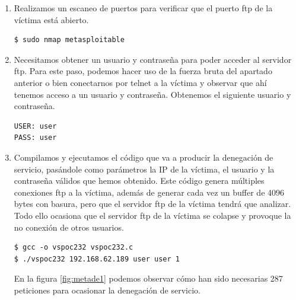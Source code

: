 \documentclass[a4,12pt,onecolum]{article}
\begin{document}
\begin{enumerate}
	\item Realizamos un escaneo de puertos para verificar que el puerto ftp de la víctima está abierto.

\begin{verbatim}
$ sudo nmap metasploitable
\end{verbatim}

	\item Necesitamos obtener un usuario y contraseña para poder acceder al servidor ftp. Para este paso, podemos hacer uso de la fuerza bruta del apartado anterior o bien conectarnos por telnet a la víctima y observar que ahí tenemos acceso a un usuario y contraseña. Obtenemos el siguiente usuario y contraseña.

\begin{verbatim}
USER: user
PASS: user
\end{verbatim}

	\item Compilamos y ejecutamos el código que va a producir la denegación de servicio, pasándole como parámetros la IP de la víctima, el usuario y la contraseña válidos que hemos obtenido. Este código genera múltiples conexiones ftp a la víctima, además de generar cada vez un buffer de 4096 bytes con basura, pero que el servidor ftp de la víctima tendrá que analizar. Todo ello ocasiona que el servidor ftp de la víctima se colapse y provoque la no conexión de otros usuarios.

\begin{verbatim}
$ gcc -o vspoc232 vspoc232.c
$ ./vspoc232 192.168.62.189 user user 1
\end{verbatim}

    En la figura \ref{fig:metade1} podemos observar cómo han sido necesarias 287 peticiones para ocasionar la denegación de servicio.

    


\end{enumerate}
\end{document}
